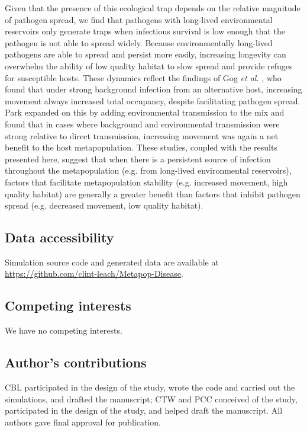 \documentclass{article}
\begin{document}
Given that the presence of this ecological trap depends on the relative magnitude of pathogen spread, we find that pathogens with long-lived environmental reservoirs only generate traps when infectious survival is low enough that the pathogen is not able to spread widely.
Because environmentally long-lived pathogens are able to spread and persist more easily, increasing longevity can overwhelm the ability of low quality habitat to slow spread and provide refuges for susceptible hosts.
These dynamics reflect the findings of Gog \emph{et al.} \cite{Gog2002}, who found that under strong background infection from an alternative host, increasing movement always increased total occupancy, despite facilitating pathogen spread.  
Park \cite{Park2012} expanded on this by adding environmental transmission to the mix and found that in cases where background and environmental transmission were strong relative to direct transmission, increasing movement was again a net benefit to the host metapopulation.  
These studies, coupled with the results presented here, suggest that when there is a persistent source of infection throughout the metapopulation (e.g. from long-lived environmental reservoirs), factors that facilitate metapopulation stability (e.g. increased movement, high quality habitat) are generally a greater benefit than factors that inhibit pathogen spread (e.g. decreased movement, low quality habitat). 


\subsection*{Data accessibility}
Simulation source code and generated data are available at \\  \url{https://github.com/clint-leach/Metapop-Disease}.

\subsection*{Competing interests}
We have no competing interests.

\subsection*{Author's contributions}
CBL participated in the design of the study, wrote the code and carried out the simulations, and drafted the manuscript; CTW and PCC conceived of the study, participated in the design of the study, and helped draft the manuscript.  All authors gave final approval for publication.
\end{document}
